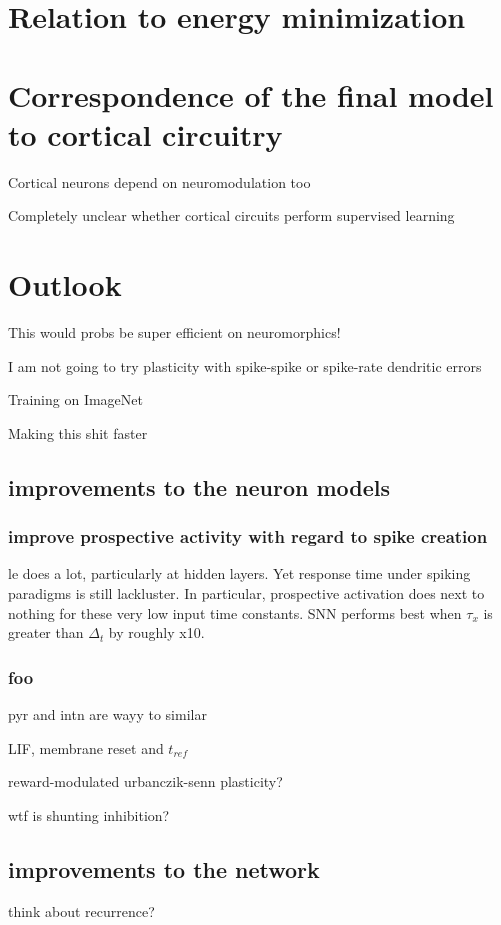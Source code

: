 \section{Relation to energy minimization}


\section{Correspondence of the final model to cortical circuitry}

Cortical neurons depend on neuromodulation too \cite{Roelfsema2018}

Completely unclear whether cortical circuits perform supervised learning \citep{magee2020synaptic}

\section{Outlook}

This would probs be super efficient on neuromorphics!

I am not going to try plasticity with spike-spike or spike-rate dendritic errors

Training on ImageNet

Making this shit faster


\subsection{improvements to the neuron models}

\subsubsection{improve prospective activity with regard to spike creation}

le does a lot, particularly at hidden layers. Yet response time under spiking paradigms is still
lackluster. In particular, prospective activation does next to nothing for these very low input time
constants. SNN performs best when $\tau_x$ is greater than $\Delta_t$ by roughly x10.

\subsubsection{foo}


pyr and intn are wayy to similar

LIF, membrane reset and $t_{ref}$

reward-modulated urbanczik-senn plasticity?

wtf is shunting inhibition?


\subsection{improvements to the network}

think about recurrence?

